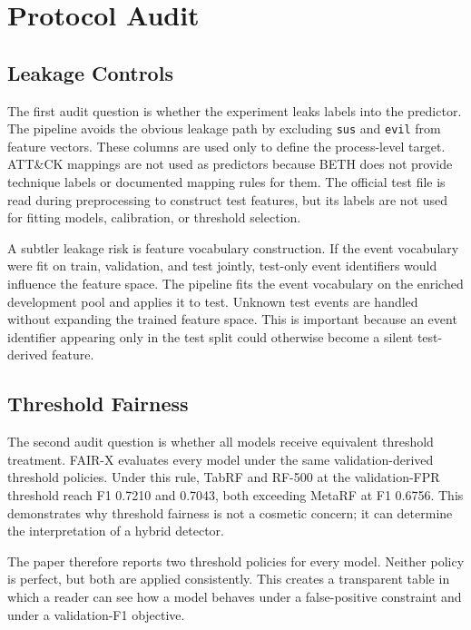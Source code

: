 \documentclass[10pt,journal,compsoc]{IEEEtran}
\begin{document}
\section{Protocol Audit}
\label{sec:audit}

\subsection{Leakage Controls}

The first audit question is whether the experiment leaks labels into the predictor. The pipeline avoids the obvious leakage path by excluding \texttt{sus} and \texttt{evil} from feature vectors. These columns are used only to define the process-level target. ATT\&CK mappings are not used as predictors because BETH does not provide technique labels or documented mapping rules for them. The official test file is read during preprocessing to construct test features, but its labels are not used for fitting models, calibration, or threshold selection.

A subtler leakage risk is feature vocabulary construction. If the event vocabulary were fit on train, validation, and test jointly, test-only event identifiers would influence the feature space. The pipeline fits the event vocabulary on the enriched development pool and applies it to test. Unknown test events are handled without expanding the trained feature space. This is important because an event identifier appearing only in the test split could otherwise become a silent test-derived feature.

\subsection{Threshold Fairness}

The second audit question is whether all models receive equivalent threshold treatment. FAIR-X evaluates every model under the same validation-derived threshold policies. Under this rule, TabRF and RF-500 at the validation-FPR threshold reach F1 0.7210 and 0.7043, both exceeding MetaRF at F1 0.6756. This demonstrates why threshold fairness is not a cosmetic concern; it can determine the interpretation of a hybrid detector.

The paper therefore reports two threshold policies for every model. Neither policy is perfect, but both are applied consistently. This creates a transparent table in which a reader can see how a model behaves under a false-positive constraint and under a validation-F1 objective.
\end{document}
